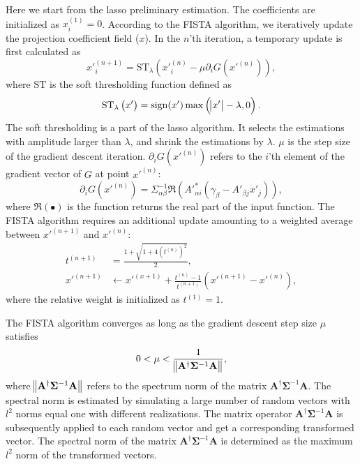 \documentclass[twocolumn]{aastex62}
\begin{document}
Here we start from the lasso preliminary estimation. The coefficients are
initialized as $x_i^{(1)}=0$. According to the FISTA algorithm, we iteratively
update the projection coefficient field ($x$). In the $n$'th iteration, a
temporary update is first calculated as
\begin{equation}
x'^{(n+1)}_{i}=\mathrm{ST}_{\lambda} \left(x'^{(n)}_{i} -\mu \partial_i G(x'^{(n)})\right),
\end{equation}
where $\mathrm{ST}$ is the soft thresholding function defined as
\begin{equation}
\mathrm{ST}_{\lambda} \left(x'\right) = \mathrm{sign} (x') \max \left(\abs{x'}-\lambda,0\right).
\end{equation}
The soft thresholding is a part of the lasso algorithm. It selects the
estimations with amplitude larger than $\lambda$, and shrink the estimations by
$\lambda$.
$\mu$ is the step size of the gradient descent iteration.  $\partial_i
G(x'^{(n)})$ refers to the $i$'th element of the gradient vector of $G$ at
point $x'^{(n)}$:
\begin{equation}
\partial_i G(x'^{(n)})=\Sigma^{-1}_{\alpha\beta}\Re\left(A'^{*}_{\alpha i}(\gamma_{\beta}-A'_{\beta j}x'_{j})\right),
\end{equation}
where $\Re\left( \bullet \right)$ is the function returns the real part of the
input function. The FISTA algorithm requires an additional update amounting to a
weighted average between
$x'^{(n+1)}$ and $x'^{(n)}$:
\begin{equation}
\begin{split}
t^{(n+1)}&=\frac{1+\sqrt{1+4(t^{(n)})^2}}{2},\\
x'^{(n+1)} &\leftarrow x'^{(x+1)}+ \frac{t^{(n)}-1}{t^{(n+1)}}(x'^{(n+1)}-x'^{(n)}),
\end{split}
\end{equation}
where the relative weight is initialized as $t^{(1)}=1$.

The FISTA algorithm converges as long as the gradient descent step size $\mu$
satisfies
\begin{equation}
 0< \mu < \frac{1}{ \norm{\mathbf{A^{\dagger}} \mathbf{\Sigma}^{-1} \mathbf{A} }},
\end{equation}
where $\norm{\mathbf{A^{\dagger}} \mathbf{\Sigma}^{-1} \mathbf{A} }$ refers to
the spectrum norm of the matrix $\mathbf{A^{\dagger}} \mathbf{\Sigma}^{-1}
\mathbf{A}$. The spectral norm is estimated by simulating a large number of
random vectors with $l^2$ norms equal one with different realizations. The
matrix operator $\mathbf{A^{\dagger}} \mathbf{\Sigma}^{-1} \mathbf{A}$ is
subsequently applied to each random vector and get a corresponding transformed
vector. The spectral norm of the matrix $\mathbf{A^{\dagger}}
\mathbf{\Sigma}^{-1} \mathbf{A}$ is determined as the maximum $l^2$ norm of the
transformed vectors.
\end{document}
